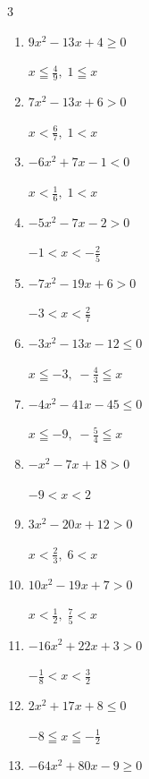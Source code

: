\begin{multicols}{3}
\begin{enumerate}
  \item $9x^{2}-13x+4\geq 0$

        $\displaystyle x \leqq \frac{4}{9} , \; 1 \leqq x$

  \item $7x^{2}-13x+6>0$

        $\displaystyle x < \frac{6}{7} , \; 1 < x$

  \item $-6x^{2}+7x-1<0$

        $\displaystyle x < \frac{1}{6} , \; 1 < x$

  \item $-5x^{2}-7x-2>0$

        $\displaystyle -1 < x < -\frac{2}{5}$

  \item $-7x^{2}-19x+6>0$

        $\displaystyle -3 < x < \frac{2}{7}$

\columnbreak %

\resetques

  \item $-3x^{2}-13x-12\leq 0$

        $\displaystyle x \leqq -3 , \; -\frac{4}{3} \leqq x$

  \item $-4x^{2}-41x-45\leq 0$

        $\displaystyle x \leqq -9 , \; -\frac{5}{4} \leqq x$

  \item $-x^{2}-7x+18>0$

        $\displaystyle -9 < x < 2$

  \item $3x^{2}-20x+12>0$

        $\displaystyle x < \frac{2}{3} , \; 6 < x$

  \item $10x^{2}-19x+7>0$

        $\displaystyle x < \frac{1}{2} , \; \frac{7}{5} < x$

  \item $-16x^{2}+22x+3>0$

        $\displaystyle -\frac{1}{8} < x < \frac{3}{2}$

  \item $2x^{2}+17x+8\leq 0$

        $\displaystyle -8 \leqq x \leqq -\frac{1}{2}$

  \item $-64x^{2}+80x-9\geq 0$


\end{enumerate}
\end{multicols}
